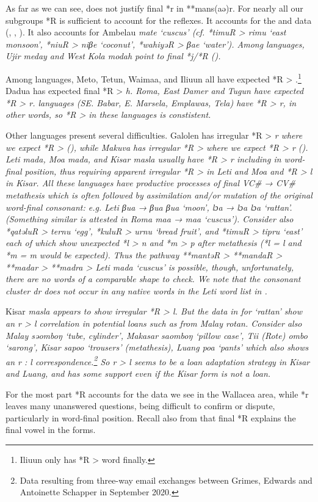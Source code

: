 As far as we can see,
\citet{Blust1982} does not justify final *r in **mans(aə)r.
For nearly all our subgroups *R is sufficient to account for the reflexes.
It accounts for the 
and  data (, , ).
It also accounts for Ambelau \it{mate} ‘cuscus’ (cf.
*timuR > \it{rimu} ‘east monsoon’,
*niuR > \it{niβe} ‘coconut’,
*wahiyəR > \it{βae} ‘water’).
Among  languages, Ujir \it{meday}
and West Kola \it{modah} point to final *j/*R ().

Among  languages, Meto,
Tetun, Waima{\Q}a, and Ili{\Q}uun all have expected *R > {\0}.\footnote{
		Ili{\Q}uun only has *R > {\0} word finally.}
Dadu{\Q}a has expected final *R > \it{h}.
Roma, East Damer and Tugun have expected *R > \it{r}.
 languages (SE. Babar, E. Marsela, Emplawas, Tela)
have *R > \it{r, {\0}} in other words,
so *R > {\0} in these languages is constistent.

Other  languages present several difficulties.
Galolen has irregular *R > \it{r} where we expect *R > {\0} (),
while Makuva has irregular *R > {\0} where we expect *R > \it{r}
(). 
Leti \it{mada}, Moa \it{mada},
and Kisar \it{masla} usually have *R > \it{r} including in
word-final position, thus requiring apparent irregular *R > {\0} in Leti
and Moa and *R > \it{l} in Kisar.
All these languages have productive processes of final VC{\#}
→ CV{\#} metathesis which is often followed by assimilation and/or
mutation of the original word-final consonant: e.g.
Leti \it{βua → βua {\tl} βua}
‘moon’, \it{lɔa → lɔa {\tl} lɔa} ‘rattan’.
(Something similar is attested in Roma \it{maa → maa} ‘cuscus’).
Consider also *qatəluR > \it{ternu} ‘egg’,
*kuluR > \it{urnu} ‘bread fruit’,
and *timuR > \it{tipru} ‘east’ each of which show unexpected
*l > \it{n} and *m > \it{p} after metathesis (*l = \it{l}
and *m = \it{m} would be expected).
Thus the pathway **mantəR > **mandaR > **madar > **madra > Leti
\it{mada} ‘cuscus’ is possible,
though, unfortunately, there are no words of a comparable shape to check.
We note that the consonant cluster \it{dr} does not occur in
any native words in the Leti word list in \citet[409--448]{vanEngelenhoven2004}.

Kisar \it{masla} appears to show irregular *R > \it{l}.
But the data in  for ‘rattan’ show an \it{r} > \it{l}
correlation in potential loans such as from Malay \it{rotan}.
Consider also Malay \it{səomboŋ} ‘tube,
cylinder’, Makasar \it{saomboŋ} ‘pillow case’,
Tii (Rote) \it{ombo} ‘sarong’,
Kisar \it{sapoo} ‘trousers’ (metathesis),
Luang \it{poa} ‘pants’ which also shows an \it{r : l} correspondence.\footnote{
		Data resulting from three-way email exchanges between
		Grimes, Edwards and Antoinette Schapper in September 2020.}
So \it{r > l} seems to be a loan adaptation strategy in Kisar
and Luang, and has some support even if the Kisar form is not
a loan.

For the most part *R accounts for the data we see in the Wallacea
area, while *r leaves many unanswered questions,
being difficult to confirm or dispute,
particularly in word-final position.
Recall also from  that final *R explains the
final vowel in the  forms.